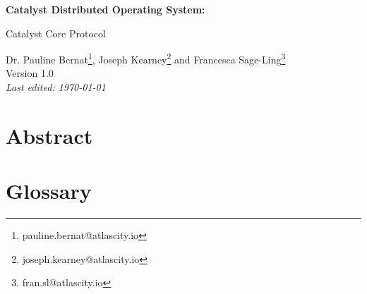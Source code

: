 \documentclass[a4paper, 12pt]{book}
\begin{document}
\begin{titlepage}

\par
\hfill
{}%
\par

\begin{center}
\vspace*{4cm}
\LARGE
\textbf{Catalyst Distributed Operating System:}
\vspace{0.5cm}

\Large{Catalyst Core Protocol}

\large
\vspace{1.5cm}
\renewcommand{\thefootnote}{\fnsymbol{footnote}}
Dr. Pauline Bernat\footnote{pauline.bernat@atlascity.io}, Joseph Kearney\footnote{joseph.kearney@atlascity.io} and Francesca Sage-Ling\footnote{fran.sl@atlascity.io}\\
\vspace{1.5cm}
Version 1.0
 \\
\vspace{0.5cm}
\textit{Last edited: \today}
\end{center}
\end{titlepage}
%



\renewcommand{\thefootnote}{\arabic{footnote}}

\chapter*{Abstract}


\tableofcontents


\chapter*{Glossary} \label{Cha:Glo}
\end{document}
